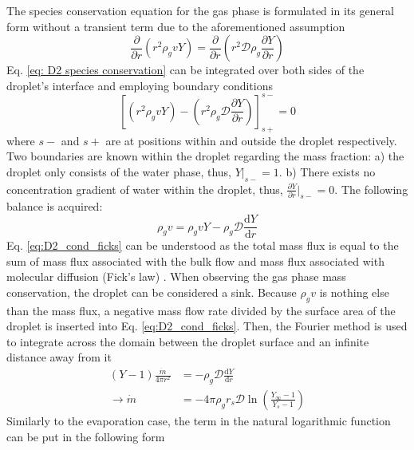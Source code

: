 \documentclass[12pt]{article}
\numberwithin{equation}{section}
\begin{document}
The species conservation equation for the gas phase is formulated in its general form without a transient term due to the aforementioned assumption
\begin{equation}\label{eq: D2 species conservation}
     \frac{\partial }{\partial r}(r^{2}\rho_{g} vY)=\frac{\partial}{\partial r}\left (r^{2}\mathcal{D} \rho_{g} \frac{\partial Y}{\partial r} \right )
\end{equation}
Eq. \ref{eq: D2 species conservation} can be integrated over both sides of the droplet's interface and employing boundary conditions
\begin{equation}
     \left[(r^{2}\rho_{g} vY)-\left(r^{2} \rho_{g} \mathcal{D} \frac{\partial Y}{\partial r}\right)\right]_{s+}^{s-} =0
\end{equation}
where $s-$ and $s+$ are at positions within and outside the droplet respectively. Two boundaries are known within the droplet regarding the mass fraction: a) the droplet only consists of the water phase, thus, $Y|_{s-}=1$. b) There exists no concentration gradient of water within the droplet, thus, $\frac{\partial Y}{\partial r}|_{s-}=0$. The following balance is acquired:
\begin{equation}\label{eq:D2_cond_ficks}
    \rho_{g} v= \rho_{g} vY-\rho_{g}\mathcal{D}\frac{\mathrm{d}Y}{\mathrm{d}r} 
\end{equation}
Eq. \ref{eq:D2_cond_ficks} can be understood as the total mass flux is equal to the sum of mass flux associated with the bulk flow and mass flux associated with molecular diffusion (Fick's law) \cite{turns2011introduction}. When observing the gas phase mass conservation, the droplet can be considered a sink. Because $\rho_{g} v$ is nothing else than the mass flux, a negative mass flow rate divided by the surface area of the droplet is inserted into Eq. \ref{eq:D2_cond_ficks}. Then, the Fourier method is used to integrate across the domain between the droplet surface and an infinite distance away from it  
\begin{equation}\label{eq:D2 _mass_transfer_concen}
    \begin{aligned}
        (Y-1)\frac{\dot m}{4\pi r^{2}}&=-\rho_{g} \mathcal{D}\frac{\mathrm{d}Y}{\mathrm{d}r}\\
        \rightarrow \dot m&=-4\pi \rho_{g}r_{s}\mathcal{D}\ln\left({\frac{Y_{\infty}-1}{Y_{s}-1}}\right)
    \end{aligned}
\end{equation}
Similarly to the evaporation case, the term in the natural logarithmic function can be put in the following form
\end{document}
